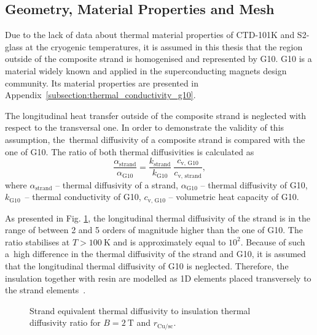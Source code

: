 
\subsection{Geometry, Material Properties and Mesh}

Due to the lack of data about thermal material properties of CTD-101K and S2-glass at the cryogenic temperatures, it is assumed in this thesis that the region outside of the composite strand is homogenised and represented by G10. G10 is a material widely known and applied in the superconducting magnets design community. Its material properties are presented in Appendix~\ref{subsection:thermal_conductivity_g10}.

The longitudinal heat transfer outside of the composite strand is neglected with respect to the transversal one. In order to demonstrate the validity of this assumption, the~thermal diffusivity of a composite strand is compared with the one of G10. The ratio of both thermal diffusivities is calculated as
\begin{equation}
    \frac{\alpha_\text{strand}}{\alpha_\text{G10}} = \frac{k_\text{strand}}{k_\text{G10}}~\frac{c_\text{v, G10}}{c_\text{v, strand}},
    \label{eqn: diffusivity_strand_to_insulation_ratio}
\end{equation}
where $\alpha_\text{strand}$ -- thermal diffusivity of a strand, $\alpha_\text{G10}$ -- thermal diffusivity of G10, $k_\text{G10}$~-- thermal conductivity of G10, $c_\text{v, G10}$ -- volumetric heat capacity of G10. 

As presented in Fig. \ref{fig:diffusivity_strand_to_insulation_ratio}, the longitudinal thermal diffusivity of the strand is in the range of between 2 and 5 orders of magnitude higher than the one of G10. The ratio stabilises at $T>100~\text{K}$ and is approximately equal to $10^2$. Because of such a~high difference in the thermal diffusivity of the strand and G10, it is assumed that the longitudinal thermal diffusivity of G10 is neglected. Therefore, the insulation together with resin are modelled as 1D elements placed transversely to the strand elements~\cite{BBQ_manual}.

\begin{figure}[H]
\centering
    \caption{Strand equivalent thermal diffusivity to insulation thermal diffusivity ratio for $B=2~\text{T}$ and $r_\text{Cu/sc}$.}
    \label{fig:diffusivity_strand_to_insulation_ratio}
\end{figure}

